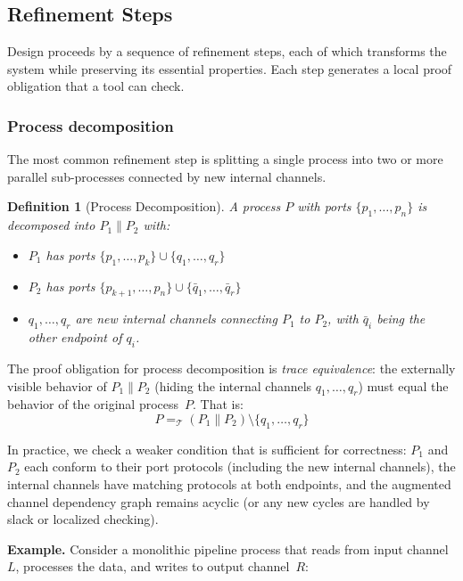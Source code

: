 \documentclass[11pt]{article}
\newtheorem{definition}[theorem]{Definition}
\begin{document}
\subsection{Refinement Steps}
\label{sec:refinement-steps}

Design proceeds by a sequence of refinement steps, each of which
transforms the system while preserving its essential properties.
Each step generates a local proof obligation that a tool can check.

\subsubsection{Process decomposition}

The most common refinement step is splitting a single process into
two or more parallel sub-processes connected by new internal channels.

\begin{definition}[Process Decomposition]
A process $P$ with ports $\{p_1, \ldots, p_n\}$ is decomposed into
$P_1 \| P_2$ with:
\begin{itemize}
\item $P_1$ has ports $\{p_1, \ldots, p_k\} \cup \{q_1, \ldots, q_r\}$
\item $P_2$ has ports $\{p_{k+1}, \ldots, p_n\} \cup \{\bar{q}_1,
  \ldots, \bar{q}_r\}$
\item $q_1, \ldots, q_r$ are new internal channels connecting $P_1$
  to $P_2$, with $\bar{q}_i$ being the other endpoint of $q_i$.
\end{itemize}
\end{definition}

The proof obligation for process decomposition is \emph{trace
equivalence}: the externally visible behavior of $P_1 \| P_2$ (hiding
the internal channels $q_1, \ldots, q_r$) must equal the behavior of
the original process~$P$.  That is:
\[
P =_{\mathcal{T}} (P_1 \| P_2) \setminus \{q_1, \ldots, q_r\}
\]

In practice, we check a weaker condition that is sufficient for
correctness: $P_1$ and $P_2$ each conform to their port protocols
(including the new internal channels), the internal channels have
matching protocols at both endpoints, and the augmented channel
dependency graph remains acyclic
(or any new cycles are handled by slack or localized checking).

\textbf{Example.} Consider a monolithic pipeline process that reads
from input channel~$L$, processes the data, and writes to output
channel~$R$:
\end{document}
